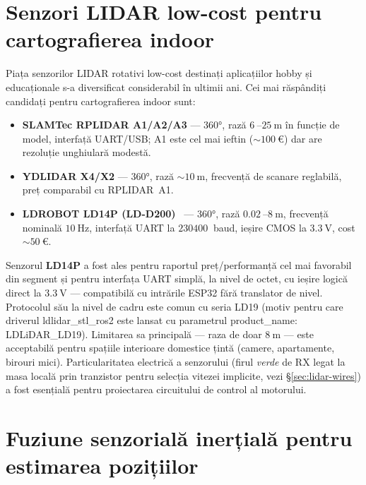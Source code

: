 \documentclass[a4paper,12pt,twoside,openany]{report}
\renewcommand{\texttt}[1]{\textnormal{#1}}
\begin{document}
\section{Senzori LIDAR low-cost pentru cartografierea indoor}
\label{sec:lidarexistente}

Piața senzorilor LIDAR rotativi low-cost destinați aplicațiilor hobby și
educaționale s-a diversificat considerabil în ultimii ani. Cei mai
răspândiți candidați pentru cartografierea indoor sunt:

\begin{itemize}\itemsep0pt
    \item \textbf{SLAMTec RPLIDAR A1/A2/A3} --- 360°, rază
          $\SI{6}{}$--$\SI{25}{\meter}$ în funcție de model, interfață
          UART/USB; A1 este cel mai ieftin ($\sim\SI{100}{\euro}$) dar are
          rezoluție unghiulară modestă.
    \item \textbf{YDLIDAR X4/X2} --- 360°, rază $\sim\SI{10}{\meter}$,
          frecvență de scanare reglabilă, preț comparabil cu RPLIDAR~A1.
    \item \textbf{LDROBOT LD14P (LD-D200)}~\cite{ld14p} --- 360°, rază
          $\SI{0.02}{}$--$\SI{8}{\meter}$, frecvență nominală
          $\SI{10}{\hertz}$, interfață UART la $\SI{230400}{}$ baud,
          ieșire CMOS la $\SI{3.3}{\volt}$, cost $\sim\SI{50}{\euro}$.
\end{itemize}

Senzorul \textbf{LD14P} a fost ales pentru raportul preț/performanță cel
mai favorabil din segment și pentru interfața UART simplă, la nivel de
octet, cu ieșire logică direct la $\SI{3.3}{\volt}$ --- compatibilă cu
intrările ESP32 fără translator de nivel. Protocolul său la nivel de cadru
este comun cu seria LD19 (motiv pentru care driverul
\texttt{ldlidar\_stl\_ros2} este lansat cu parametrul
\texttt{product\_name: LDLiDAR\_LD19}). Limitarea sa principală --- raza
de doar $\SI{8}{\meter}$ --- este acceptabilă pentru spațiile interioare
domestice țintă (camere, apartamente, birouri mici). Particularitatea
electrică a senzorului (firul \textit{verde} de RX legat la masa locală
prin tranzistor pentru selecția vitezei implicite, vezi
§\ref{sec:lidar-wires}) a fost esențială pentru proiectarea circuitului
de control al motorului.

\section{Fuziune senzorială inerțială pentru estimarea pozițiilor}
\label{sec:imuexistente}
\end{document}
